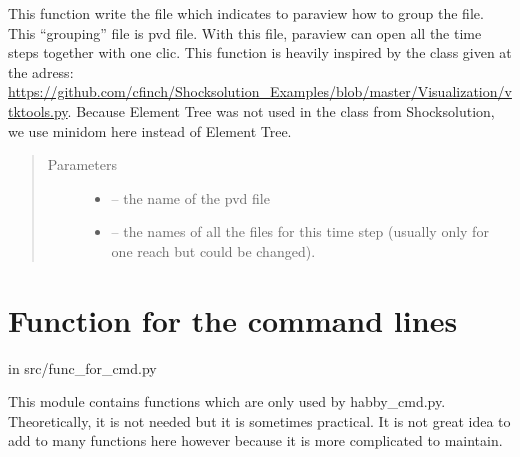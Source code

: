 \documentclass[letterpaper,10pt,english]{sphinxmanual}
\begin{document}
\begin{fulllineitems}
\label{\detokenize{index:src.new_create_vtk.writePVD}}
This function write the file which indicates to paraview how to group the file. This ``grouping'' file is pvd file.
With this file, paraview can open all the time steps together with one clic. This function is heavily inspired
by the class given at the adress:
\url{https://github.com/cfinch/Shocksolution\_Examples/blob/master/Visualization/vtktools.py}. Because Element Tree
was not used in the class from Shocksolution, we use minidom here instead of Element Tree.
\begin{quote}\begin{description}
\item[{Parameters}] \leavevmode\begin{itemize}
\item {} 
 -- the name of the pvd file

\item {} 
 -- the names of all the files for this time step (usually only for one reach but could be changed).

\end{itemize}

\end{description}\end{quote}

\end{fulllineitems}



\section{Function for the command lines}
\label{\detokenize{index:function-for-the-command-lines}}
in src/func\_for\_cmd.py

This module contains functions which are only used by habby\_cmd.py. Theoretically, it is not needed but it is sometimes practical.
It is not great idea to add to many functions here however because it is more complicated to maintain.
\label{\detokenize{index:module-src.func_for_cmd}}
\end{document}
